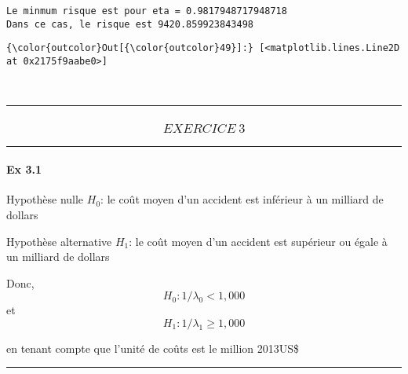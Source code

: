 \documentclass[11pt]{article}
\begin{document}
    \begin{Verbatim}[commandchars=\\\{\}]
Le minmum risque est pour eta = 0.9817948717948718
Dans ce cas, le risque est 9420.859923843498

    \end{Verbatim}

\begin{Verbatim}[commandchars=\\\{\}]
{\color{outcolor}Out[{\color{outcolor}49}]:} [<matplotlib.lines.Line2D at 0x2175f9aabe0>]
\end{Verbatim}
            
    \begin{center}
    \end{center}
    { \hspace*{\fill} \\}
    
    \begin{center}\rule{0.5\linewidth}{\linethickness}\end{center}

\subsubsection{\texorpdfstring{\[EXERCICE\ 3\]}{EXERCICE\textbackslash{} 3}}\label{exercice-3}

    \begin{center}\rule{0.5\linewidth}{\linethickness}\end{center}

\paragraph{Ex 3.1}\label{ex-3.1}

    Hypothèse nulle \(H_0\): le coût moyen d'un accident est inférieur à un
milliard de dollars

Hypothèse alternative \(H_1\): le coût moyen d'un accident est supérieur
ou égale à un milliard de dollars

Donc, \[H_0: 1/\lambda_0 < 1,000\] et \[H_1: 1/\lambda_1 \geq 1,000\]

en tenant compte que l'unité de coûts est le million 2013US\$

    \begin{center}\rule{0.5\linewidth}{\linethickness}\end{center}
\end{document}
